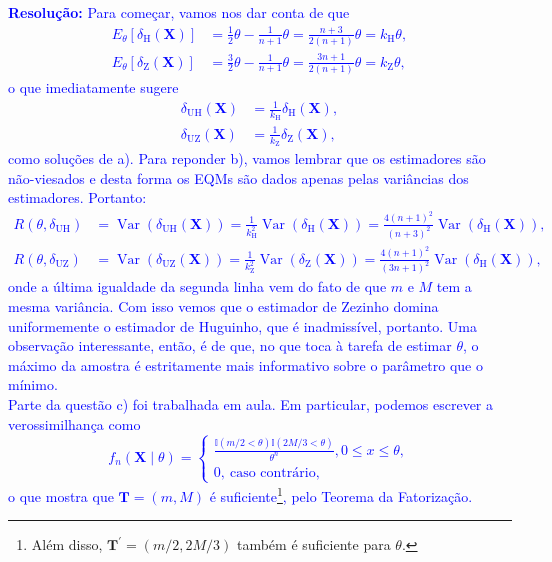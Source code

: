 \documentclass[a4paper,10pt, notitlepage]{report}
\newcommand{\vr}{\operatorname{Var}} %
\newcommand{\bX}{\boldsymbol{X}} %
\begin{document}
\textcolor{blue}{
\textbf{Resolução:} Para começar, vamos nos dar conta de que 
\begin{align*}
 E_\theta\left[\delta_{\text{H}}(\bX)\right] &= \frac{1}{2}\theta - \frac{1}{n+1}\theta = \frac{n+3}{2(n+1)} \theta = k_{\text{H}}\theta,\\
 E_\theta\left[\delta_{\text{Z}}(\bX) \right] &= \frac{3}{2}\theta - \frac{1}{n+1}\theta = \frac{3n + 1}{2(n+1)}\theta = k_{\text{Z}}\theta,
\end{align*}
o que imediatamente sugere
\begin{align*}
 \delta_{\text{UH}}(\bX) &= \frac{1}{k_{\text{H}}}\delta_{\text{H}}(\bX),\\
\delta_{\text{UZ}}(\bX) &= \frac{1}{k_{\text{Z}}}\delta_{\text{Z}}(\bX),
\end{align*}
como soluções de a).
Para reponder b), vamos lembrar que os estimadores são não-viesados e desta forma os EQMs são dados apenas pelas variâncias dos estimadores.
Portanto:
\begin{align*}
R\left(\theta, \delta_{\text{UH}}\right) &= \vr\left(\delta_{\text{UH}}(\bX)\right) = \frac{1}{k_{\text{H}}^2}\vr\left( \delta_{\text{H}}(\bX)\right) = \frac{4(n+1)^2}{(n+3)^2}\vr\left( \delta_{\text{H}}(\bX)\right),\\
R\left(\theta, \delta_{\text{UZ}}\right) &= \vr\left(\delta_{\text{UZ}}(\bX)\right) = \frac{1}{k_{\text{Z}}^2}\vr\left( \delta_{\text{Z}}(\bX)\right) = \frac{4(n+1)^2}{(3n+1)^2}\vr\left( \delta_{\text{H}}(\bX)\right),
\end{align*}
onde a última igualdade da segunda linha vem do fato de que $m$ e $M$ tem a mesma variância. 
Com isso vemos que o estimador de Zezinho domina uniformemente o estimador de Huguinho, que é inadmissível, portanto.
Uma observação interessante, então, é de que, no que toca à tarefa de estimar $\theta$, o máximo da amostra é estritamente mais informativo sobre o parâmetro que o mínimo.
\\
Parte da questão c) foi trabalhada em aula.
Em particular, podemos escrever a verossimilhança como
$$
f_n(\bX \mid \theta) =  \begin{cases}
     \frac{\mathbb{I}\left( m/2 < \theta\right)\mathbb{I}\left(2M/3 < \theta\right)}{\theta^n}, 0 \leq x \leq \theta,\\
     0,\:\text{caso contrário},
\end{cases}
$$
o que mostra que $\boldsymbol{T} = (m, M)$ é suficiente\footnote{Além disso, $\boldsymbol{T}^\prime = (m/2, 2M/3)$ também é suficiente para $\theta$.}, pelo Teorema da Fatorização.
}
\end{document}
